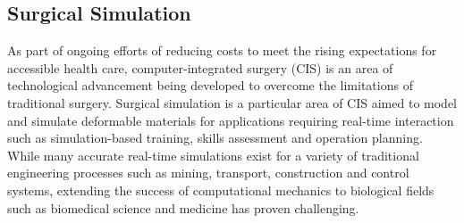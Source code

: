 \begin{comment}


Meshless models for simulating materials

Homogenous Materials:
Brain Deformations: https://www.sciencedirect.com/science/article/pii/S002192900600090X

Meshless Lagrangian explicit dynamics algorithm:
http://isml.ecm.uwa.edu.au/ISML/Publication/pdfs/2010hortonmillerIJfNMiBEmeshless.pdf

Volume rendering consists of techniques for 3D surface construction.

Non linear methods:
Moving least squared: http://www.cs.utah.edu/~csilva/courses/cpsc7960/pdf/lancaster-salkauskas-mls.pdf

Total Lagrangian explicit dynamics finite element algorithm for computing soft tissue deformation, 2006

Patient-specific model of brain deformation: Application to medical image registration, 2007

Open-source platforms for navigated image-guided interventions, 2016

(Hyper)-graphical models in biomedical image analysis, 2016


Camera tracking objects is bad, handling occlusions is problematic


Total Lagrangian explicit dynamics finite element algorithm for computing soft tissue deformation \cite{Miller2007}

Patient-specific model of brain deformation: Application to medical image registration
\cite{Wittek2007}

A meshless Total Lagrangian explicit dynamics algorithm for surgical simulation
\cite{Horton2010}

\end{comment}

\subsection{Surgical Simulation}

As part of ongoing efforts of reducing costs to meet the rising expectations for accessible health care, computer-integrated surgery (CIS) is an area of technological advancement being developed to overcome the limitations of traditional surgery. Surgical simulation is a particular area of CIS aimed to model and simulate deformable materials for applications requiring real-time interaction such as simulation-based training, skills assessment and operation planning.\cite{Miller2007} While many accurate real-time simulations exist for a variety of traditional engineering processes such as mining, transport, construction and control systems, extending the success of computational mechanics to biological fields such as biomedical science and medicine has proven challenging. \cite{Tinsley2003}

